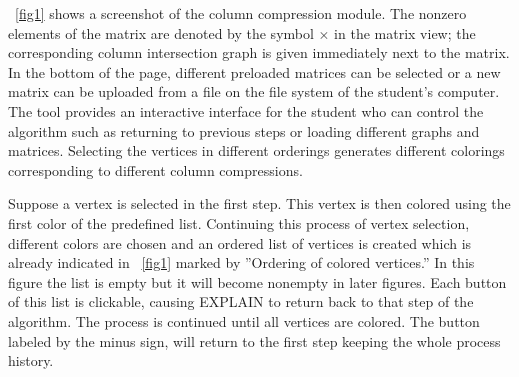 \documentclass[12pt, oneside]{book}
\begin{document}
\figurename~\ref{fig1} shows a screenshot of the column compression module. The nonzero elements of the matrix are denoted by the symbol $\times$ in the matrix view; the corresponding column intersection graph is given immediately next to the matrix. In the bottom of the page, different preloaded matrices can be selected or a new matrix can be uploaded from a file on the file system of the student's computer. The tool provides an interactive interface for the student who can control the algorithm such as returning to previous steps or loading different graphs and matrices. Selecting the vertices in different orderings generates different colorings corresponding to different column compressions.

Suppose a vertex is selected in the first step. This vertex is then colored using the first color of the predefined list. Continuing this process of vertex selection, different colors are chosen and an ordered list of vertices is created which is already indicated in \figurename~\ref{fig1} marked by ''Ordering of colored vertices.'' In this figure the list is empty but it will become nonempty in later figures. Each button of this list is clickable, causing \mbox{EXPLAIN} to return back to that step of the algorithm. The process is continued until all vertices are colored. The button labeled by the minus sign, will return to the first step keeping the whole process history.
\end{document}
